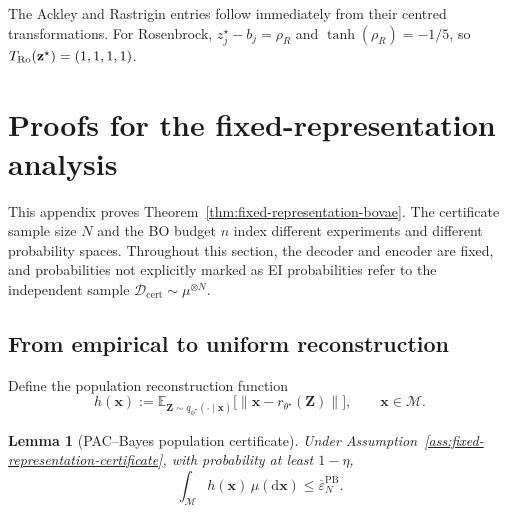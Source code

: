 \documentclass[pdflatex,sn-mathphys-num]{sn-jnl}%
\theoremstyle{thmstyleone}%
\newtheorem{lemma}[theorem]{Lemma}
\theoremstyle{thmstyletwo}%
\theoremstyle{thmstylethree}%
\begin{document}
\begin{appendices}
\begin{table}[h]
\begin{tabularx}{\linewidth}{@{}l l l l @{}}
\bottomrule
\end{tabularx}
\end{table}


The Ackley and Rastrigin entries follow immediately from their centred transformations.  For Rosenbrock, $z_j^\star-b_j=\rho_R$ and $\tanh(\rho_R)=-1/5$, so $T_{\rm Ro}(\mathbf z^\star)=(1,1,1,1)$.

\section{Proofs for the fixed-representation analysis}
\label{app:fixed-representation-proofs}

This appendix proves Theorem~\ref{thm:fixed-representation-bovae}.  The certificate sample size $N$ and the BO budget $n$ index different experiments and different probability spaces.  Throughout this section, the decoder and encoder are fixed, and probabilities not explicitly marked as EI probabilities refer to the independent sample $\mathcal{D}_{\mathrm{cert}}\sim\mu^{\otimes N}$.

\subsection{From empirical to uniform reconstruction}

Define the population reconstruction function
\begin{equation}
  h(\mathbf{x}):=
  \mathbb{E}_{\mathbf{Z}\sim q_{\phi^\star}(\cdot\mid\mathbf{x})}
  \bigl[\|\mathbf{x}-r_{\theta^\star}(\mathbf{Z})\|\bigr],
  \qquad \mathbf{x}\in\mathcal{M}.
  \label{eq:population-reconstruction-function}
\end{equation}

\begin{lemma}[PAC--Bayes population certificate]
\label{lem:pac-bayes-population-certificate}
Under Assumption~\ref{ass:fixed-representation-certificate}, with probability
at least $1-\eta$,
\begin{equation}
  \int_{\mathcal{M}}h(\mathbf{x})\,\mu(\mathrm d\mathbf{x})
  \leq \overline\varepsilon_N^{\mathrm{PB}}.
  \label{eq:population-reconstruction-bound}
\end{equation}
\end{lemma}


\end{appendices}
\end{document}
